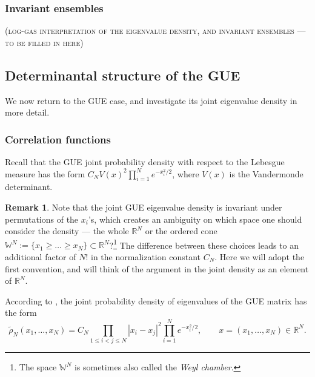 \documentclass[letterpaper,11pt,oneside,reqno]{amsart}
\numberwithin{equation}{section}
\newcommand{\note}[1]{\textsc{\color{blue}(#1)}}
\newcounter{lecture}
\newcommand{\lect}[1]{\bigskip\addtocounter{lecture}{1}\noindent{\Large{\color{red}\bf{}Lecture \#\arabic{lecture} on #1 \hrulefill}}}
\theoremstyle{definition}
\newtheorem{remark}[proposition]{Remark}
\begin{document}

\subsubsection{Invariant ensembles} %
\label{ssub:invariant_ensembles}

\note{log-gas interpretation of the eigenvalue density, and invariant ensembles --- to be filled in here}



\lect{2/10/2016}

\subsection{Determinantal structure of the GUE} %
\label{sub:determinantal_structure_of_the_gue}
We now return to the GUE case, and investigate 
its joint eigenvalue density in more detail. 

\subsubsection{Correlation functions} %
\label{ssub:correlation_functions}

Recall that the GUE joint probability density 
with respect to the Lebesgue measure has the form
$C_N V(x)^2 \prod_{i=1}^{N} e^{-x_i^2/2}$,
where $V(x)$ is the Vandermonde determinant.
\begin{remark}\label{rmk:ordering}
	Note that the joint GUE eigenvalue density is invariant under permutations
	of the $x_i$'s, which creates an ambiguity on which space one should consider the 
	density --- the whole $\mathbb{R}^{N}$ or the ordered cone 
	$\mathbb{W}^{N}:=\{x_1\ge \ldots\ge x_N\}\subset\mathbb{R}^{N}$?\footnote{The space
	$\mathbb{W}^{N}$ is sometimes also called the \emph{Weyl chamber}.} 
	The difference between these choices leads to an additional factor of $N!$ in the normalization
	constant $C_N$.
	Here we will adopt the first 
	convention, and will think of the argument in 
	the joint density as an element of $\mathbb{R}^{N}$.
\end{remark}
According to , the joint probability density of eigenvalues
of the GUE matrix has the form
\begin{equation}\label{GUE_density}
	\tilde \rho_N(x_1,\ldots,x_N)=C_N \prod_{1\le i<j\le N}|x_i-x_j|^{2} \prod_{i=1}^{N} e^{-x_i^2/2},\qquad
	x=(x_1,\ldots,x_N)\in\mathbb{R}^{N}.
\end{equation}
\end{document}
